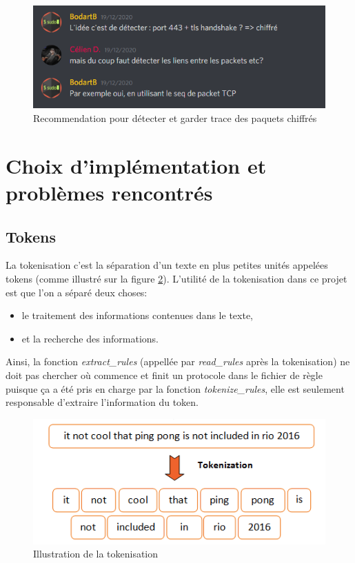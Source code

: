\documentclass[a4paper]{article}
\begin{document}
\begin{figure}[H]
    \centering
    \includegraphics[width=0.75\linewidth]{images/tls-01.PNG}
    \caption{Recommendation pour détecter et garder trace des paquets chiffrés}
    \label{fig:tls01}
\end{figure}










\section{Choix d'implémentation et problèmes rencontrés} \label{sec:implspec}





\subsection{Tokens} \label{subsec:tokens}



La tokenisation c'est la séparation d'un texte en plus petites unités appelées tokens (comme illustré sur la figure \ref{fig:tokenization}). L'utilité de la tokenisation dans ce projet est que l'on a séparé deux choses:
\begin{itemize}
    \item le traitement des informations contenues dans le texte,
    \item et la recherche des informations.
\end{itemize}
Ainsi, la fonction \textit{extract\_rules} (appellée par \textit{read\_rules} après la tokenisation) ne doit pas chercher où commence et finit un protocole dans le fichier de règle puisque ça a été pris en charge par la fonction \textit{tokenize\_rules}, elle est seulement responsable d'extraire l'information du token.

\begin{figure}[H]
    \centering
    \includegraphics[width=0.65\linewidth]{images/tokenization.png}
    \caption{Illustration de la tokenisation \cite{6}}
    \label{fig:tokenization}
\end{figure}
\end{document}
